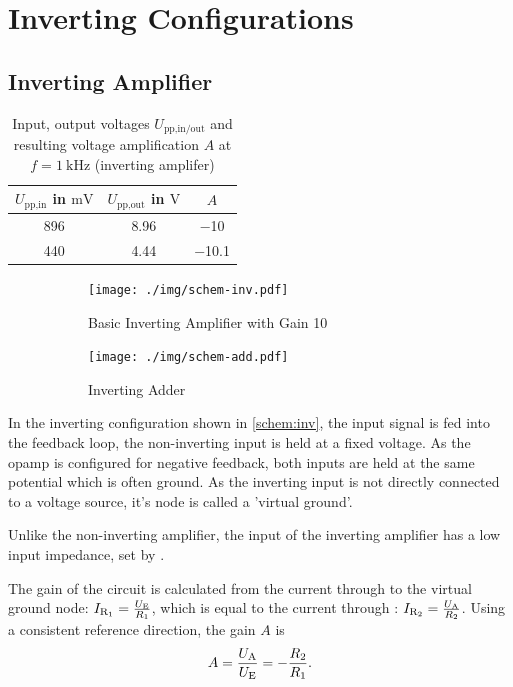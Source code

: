 \chapter{Inverting Configurations}
\section{Inverting Amplifier}

\begin{table}[tbp]
	\centering
	\caption[Inverting Amplifier Gain]{Input, output voltages $U_\text{pp,in/out}$ and resulting voltage amplification $A$ at $f=\SI{1}{\kilo\hertz}$ (inverting amplifer)}
	\label{tab:inv_vals}
	\begin{tabular}{SSS}
		\toprule
		{$U_\text{pp,in}$ in $\si{\milli\volt}$}&	{$U_\text{pp,out}$ in $\si{\volt}$}&	{$A$}\\
		\midrule
		\num{896}	&	\num{8.96}	&	\num{-10}\\
		\num{440}	&	\num{4.44}	&	\num{-10.1}\\
		\bottomrule
	\end{tabular}
\end{table}

\begin{figure}
	\centering
	\begin{subfigure}{0.4\textwidth}
		\centering
		\texttt{[image: ./img/schem-inv.pdf]}
		\caption{Basic Inverting Amplifier with Gain 10}
		\label{schem:inv}
	\end{subfigure}
	\begin{subfigure}{0.4\textwidth}
		\centering
		\texttt{[image: ./img/schem-add.pdf]}
		\caption{Inverting Adder}
		\label{schem:add}
	\end{subfigure}
	\caption[Schematics of Inverting Configurations]{}
\end{figure}

In the inverting configuration shown in \autoref{schem:inv}, the input signal is fed into the feedback loop, the non-inverting input is held at a fixed voltage.
As the opamp is configured for negative feedback, both inputs are held at the same potential which is often ground.
As the inverting input is not directly connected to a voltage source, it's node is called a 'virtual ground'.

Unlike the non-inverting amplifier, the input of the inverting amplifier has a low input impedance, set by .

The gain of the circuit is calculated from the current through  to the virtual ground node: $I_{\mathrm{R_1}} = \frac{U_\text{E}}{R_1}$, which is equal to the current through : $I_{\mathrm{R_2}} = \frac{U_\text{A}}{R_2}$.
Using a consistent reference direction, the gain  $A$ is \[A = \frac{U_\text{A}}{U_\text{E}} = -\frac{R_2}{R_1}.\]

